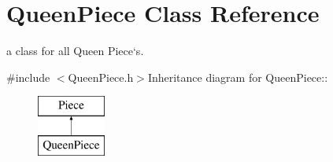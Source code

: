 \hypertarget{classQueenPiece}{
\section{QueenPiece Class Reference}
\label{classQueenPiece}
}


a class for all Queen Piece`s.  


{\ttfamily \#include $<$QueenPiece.h$>$}Inheritance diagram for QueenPiece::\begin{figure}[H]
\begin{center}
\leavevmode
\includegraphics[height=2cm]{classQueenPiece}
\end{center}
\end{figure}
